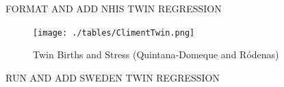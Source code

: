 \documentclass[10pt,letterpaper,subeqn]{beamer}
\begin{document}
 \begin{frame}[label=USA2]

FORMAT AND ADD NHIS TWIN REGRESSION
\hyperlink{c}{}
\end{frame}

\begin{frame}[label=Scotland]

\hyperlink{c}{}
\end{frame}

 \begin{frame}[label=Spain1]

\hyperlink{c}{}
\end{frame}

 \begin{frame}[label=Spain2]
\begin{figure}[htpb!]
\caption{Twin Births and Stress (Quintana-Domeque and R\'odenas)}
\centering
  \texttt{[image: ./tables/ClimentTwin.png]}
\end{figure}
\hyperlink{c}{}
\end{frame}

 \begin{frame}[label=Brazil]

\hyperlink{c}{}
\end{frame}

\begin{frame}[label=Sweden]
RUN AND ADD SWEDEN TWIN REGRESSION
\hyperlink{c}{}
\end{frame}

\begin{frame}[label=TwinDeath]

\end{frame}

\begin{frame}

\hyperlink{c}{}
\end{frame}

\begin{frame}[label=surv]

\hyperlink{robust}{}
\end{frame}



\frame{
\begin{center}
\Large \textcolor{blue}{Appendix Figures}
\end{center}
}
\end{document}
